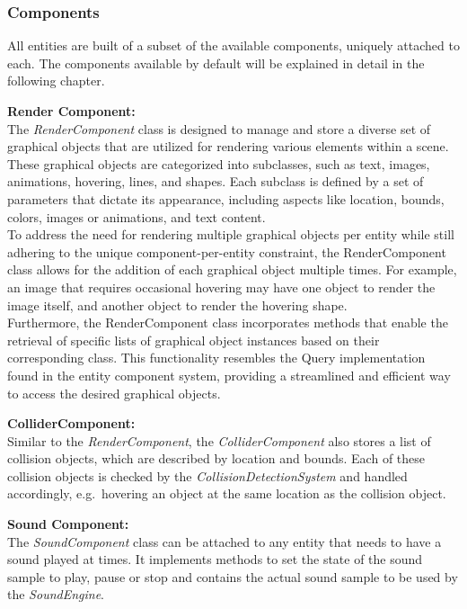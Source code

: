 \subsubsection{Components}\label{subsubsec:components}
All entities are built of a subset of the available components, uniquely attached to each.
The components available by default will be explained in detail in the following chapter.

\textbf{Render Component:} \\
The \textit{RenderComponent} class is designed to manage and store a diverse set of graphical objects that are utilized for
rendering various elements within a scene.
These graphical objects are categorized into subclasses, such as text, images, animations, hovering, lines, and shapes.
Each subclass is defined by a set of parameters that dictate its appearance, including aspects like location, bounds, colors,
images or animations, and text content.
\\
To address the need for rendering multiple graphical objects per entity while still adhering to the unique
component-per-entity constraint, the RenderComponent class allows for the addition of each graphical object multiple times.
For example, an image that requires occasional hovering may have one object to render the image itself, and
another object to render the hovering shape.
\\
Furthermore, the RenderComponent class incorporates methods that enable the retrieval of specific lists of
graphical object instances based on their corresponding class.
This functionality resembles the Query implementation found in the entity component system, providing a
streamlined and efficient way to access the desired graphical objects.

\textbf{ColliderComponent:} \\
Similar to the \textit{RenderComponent}, the \textit{ColliderComponent} also stores a list of collision objects, which are described by location and bounds.
Each of these collision objects is checked by the \textit{CollisionDetectionSystem} and handled accordingly, e.g.\
hovering an object at the same location as the collision object.

\textbf{Sound Component:} \\
The \textit{SoundComponent} class can be attached to any entity that needs to have a sound played at times.
It implements methods to set the state of the sound sample to play, pause or stop and contains the actual sound sample to be used by the \textit{SoundEngine}.


